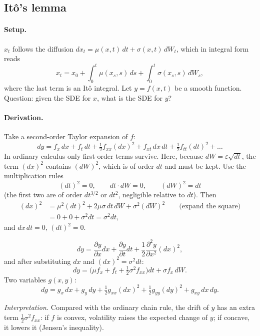 \subsection{It\^o's lemma }\label{sec:ito}

\paragraph{Setup.} $x_t$ follows the diffusion $dx_t=\mu(x,t)\,dt+\sigma(x,t)\,dW_t$, which in integral form reads
\[
x_t=x_0+\int_0^t\mu(x_s,s)\,ds+\int_0^t\sigma(x_s,s)\,dW_s,
\]
where the last term is an It\^o integral. Let $y=f(x,t)$ be a smooth function. Question: given the SDE for $x$, what is the SDE for $y$?

\paragraph{Derivation.} Take a second-order Taylor expansion of $f$:
\[
dy=f_x\,dx+f_t\,dt+\tfrac12f_{xx}(dx)^2+f_{xt}\,dx\,dt+\tfrac12f_{tt}(dt)^2+\dots
\]
In ordinary calculus only first-order terms survive. Here, because $dW=\varepsilon\sqrt{dt}$, the term $(dx)^2$ contains $(dW)^2$, which is of order $dt$ and must be kept. Use the multiplication rules
\[
(dt)^2=0,\qquad dt\cdot dW=0,\qquad (dW)^2=dt
\]
(the first two are of order $dt^{3/2}$ or $dt^2$, negligible relative to $dt$). Then
\begin{align*}
(dx)^2&=\mu^2(dt)^2+2\mu\sigma\,dt\,dW+\sigma^2(dW)^2\qquad\text{(expand the square)}\\
&=0+0+\sigma^2dt=\sigma^2dt,
\end{align*}
and $dx\,dt=0$, $(dt)^2=0$.

\begin{keybox}[title=It\^o's lemma]
\[
dy=\frac{\partial y}{\partial x}dx+\frac{\partial y}{\partial t}dt+\frac12\frac{\partial^2y}{\partial x^2}(dx)^2,
\]
and after substituting $dx$ and $(dx)^2=\sigma^2dt$:
\begin{equation}\label{eq:ito}
dy=\Big(\mu f_x+f_t+\tfrac12\sigma^2f_{xx}\Big)dt+\sigma f_x\,dW.
\end{equation}
Two variables $g(x,y)$:
\[
dg=g_x\,dx+g_y\,dy+\tfrac12g_{xx}(dx)^2+\tfrac12g_{yy}(dy)^2+g_{xy}\,dx\,dy.
\]
\end{keybox}
\textit{Interpretation.} Compared with the ordinary chain rule, the drift of $y$ has an extra term $\tfrac12\sigma^2f_{xx}$: if $f$ is convex, volatility raises the expected change of $y$; if concave, it lowers it (Jensen's inequality).

